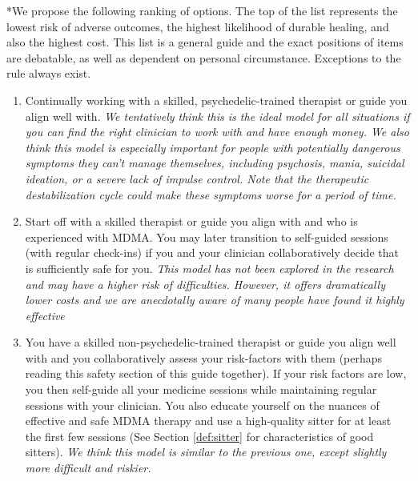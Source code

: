 \documentclass[12pt,letterpaper]{article}
\begin{document}
*We propose the following ranking of options. The top of the list represents the lowest risk of adverse outcomes, the highest likelihood of durable healing, and also the highest cost. This list is a general guide and the exact positions of items are debatable, as well as dependent on personal circumstance. Exceptions to the rule always exist.
\begin{enumerate}
    \item Continually working with a skilled, psychedelic-trained therapist or guide you align well with. \textit{We tentatively think this is the ideal model for all situations if you can find the right clinician to work with and have enough money. We also think this model is especially important for people with potentially dangerous symptoms they can't manage themselves, including psychosis, mania, suicidal ideation, or a severe lack of impulse control. Note that the therapeutic destabilization cycle could make these symptoms worse for a period of time.}
    \item Start off with a skilled therapist or guide you align with and who is experienced with MDMA. You may later transition to self-guided sessions (with regular check-ins) if you and your clinician collaboratively decide that is sufficiently safe for you. \textit{This model has not been explored in the research and may have a higher risk of difficulties. However, it offers dramatically lower costs and we are anecdotally aware of many people have found it highly effective}
    \item You have a skilled non-psychedelic-trained therapist or guide you align well with and you collaboratively assess your risk-factors with them (perhaps reading this safety section of this guide together). If your risk factors are low, you then self-guide all your medicine sessions while maintaining regular sessions with your clinician. You also educate yourself on the nuances of effective and safe MDMA therapy and use a high-quality sitter for at least the first few sessions (See Section \ref{def:sitter} for characteristics of good sitters). \textit{We think this model is similar to the previous one, except slightly more difficult and riskier.}

\end{enumerate}
\end{document}
